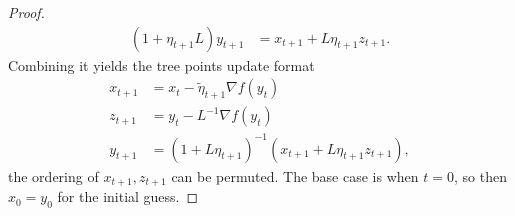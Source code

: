 \documentclass[12pt]{article}
\begin{document}
\begin{proof}
\begin{align*}
                    (1 + \eta_{t + 1}L)y_{t + 1} &= 
                    x_{t + 1} + L\eta_{t + 1}z_{t + 1}. 
                \end{align*}
                Combining it yields the tree points update format 
                \begin{align*}
                    x_{t + 1} &= x_t - \tilde \eta_{t + 1} \nabla f(y_t) 
                    \\
                    z_{t + 1} &= y_t - L^{-1} \nabla f(y_t) 
                    \\
                    y_{t + 1} &= 
                    (1 + L\eta_{t + 1})^{-1}
                    (
                    x_{t + 1} + L\eta_{t + 1}z_{t + 1}
                    ), 
                \end{align*}
                the ordering of $x_{t +1}, z_{t + 1}$ can be permuted. 
                The base case is when $t = 0$, so then $x_0 = y_0$ for the initial guess.
            \end{proof}
\end{document}
